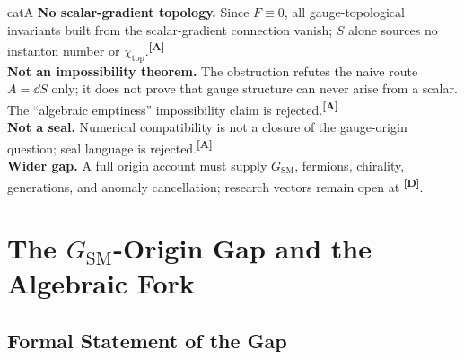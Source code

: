 \documentclass[12pt,a4paper,twoside]{article}
\theoremstyle{plain}
\theoremstyle{definition}
\theoremstyle{remark}
\newcommand{\catmark}[1]{\textsuperscript{\textsf{\textbf{[#1]}}}}
\begin{document}
\begin{evidencebox}{catA}
\textbf{No scalar-gradient topology.} Since $F \equiv 0$, all gauge-topological invariants built from the scalar-gradient connection vanish; $S$ alone sources no
instanton number or $\chi_{\mathrm{top}}$.\catmark{A}\\[0.3em]
\textbf{Not an impossibility theorem.} The obstruction refutes the naive route $A=\dd S$ only; it does not prove that gauge structure can never arise from a scalar. The ``algebraic emptiness'' impossibility claim is
rejected.\catmark{A}\\[0.3em]
\textbf{Not a seal.} Numerical compatibility is not a closure of the
gauge-origin question; seal language is rejected.\catmark{A}\\[0.3em]
\textbf{Wider gap.} A full origin account must supply $G_{\mathrm{SM}}$, fermions, chirality, generations, and anomaly cancellation; research vectors remain open at \catmark{D}.
\end{evidencebox}


\section{The \texorpdfstring{$G_{\mathrm{SM}}$}{G_SM}-Origin Gap and the Algebraic Fork}
\label{sec:algebraic-fork}

\subsection{Formal Statement of the Gap}
\label{subsec:gsm-gap-statement}
\end{document}
